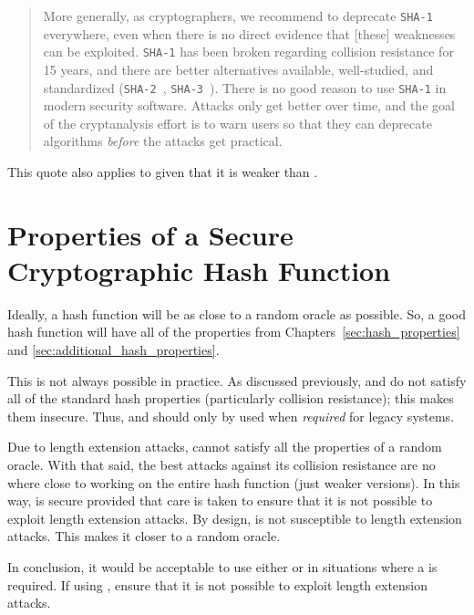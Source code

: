 \begin{quote}
    More generally, as cryptographers, we recommend to deprecate
    \texttt{SHA-1} everywhere, even when there is no direct evidence
    that [these] weaknesses can be exploited.
    \texttt{SHA-1} has been broken regarding collision resistance for 15 years,
    and there are better alternatives available, well-studied,
    and standardized (\texttt{SHA-2}~\cite{FIPS-180-4-2015},
    \texttt{SHA-3}~\cite{FIPS-202}).
    There is no good reason to use \texttt{SHA-1} in modern security software.
    Attacks only get better over time,
    and the goal of the cryptanalysis effort is to warn users
    so that they can deprecate algorithms
    \emph{before} the attacks get practical.
\end{quote}

\noindent
This quote also applies to \MDFive{} given that it is weaker than \ShaOne{}.






\section{Properties of a Secure Cryptographic Hash Function}

Ideally, a \gls{hash function} will be as close to a
\gls{random oracle} as possible.
So, a good \gls{hash function} will have all of the properties
from Chapters~\ref{sec:hash_properties} and
\ref{sec:additional_hash_properties}.

This is not always possible in practice.
As discussed previously, \MDFive{} and \ShaOne{} do not satisfy
all of the standard hash properties (particularly collision resistance);
this makes them insecure.
Thus, \MDFive{} and \ShaOne{} should only by used
when \emph{required} for legacy systems.

Due to length extension attacks, \ShaTwo{} cannot satisfy
all the properties of a \gls{random oracle}.
With that said, the best attacks against its collision resistance
are no where close to working on the entire \gls{hash function}
(just weaker versions).
In this way, \ShaTwo{} is secure provided that care is taken
to ensure that it is not possible to exploit length extension attacks.
By design, \ShaThree{} is not susceptible to length extension attacks.
This makes it closer to a \gls{random oracle}.

In conclusion, it would be acceptable to use either \ShaTwo{} or \ShaThree{}
in situations where a  is required.
If using \ShaTwo{}, ensure that it is not possible
to exploit length extension attacks.
